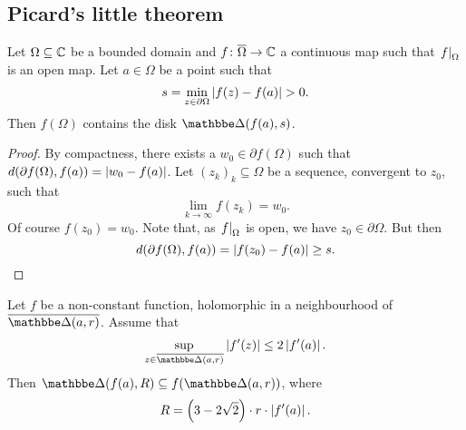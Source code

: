 \newpage

\subsection{Picard's little theorem}


\begin{lema}
Let $\Omega \subseteq \mathbb{C}$ be a bounded domain and
$f \colon \overline{\Omega} \to \mathbb{C}$ a continuous map such that
$\left. f\right|_{\Omega}^{}$ is an open map. Let $a \in \Omega$ be a point
such that
\[
s = \min_{z \in \partial \Omega} \left\lvert f(z) - f(a)\right\rvert > 0.
\]
Then $f(\Omega)$ contains the disk $\dsk(f(a), s)$.
\end{lema}

\begin{proof}
By compactness, there exists a $w_0 \in \partial f(\Omega)$ such
that $d(\partial f(\Omega), f(a)) = \left\lvert w_0 - f(a)\right\rvert$. Let
$(z_k)_k \subseteq \Omega$ be a sequence, convergent to $z_0$, such
that
\[
\lim_{k \to \infty} f(z_k) = w_0.
\]
Of course $f(z_0) = w_0$. Note that, as $\left. f\right|_{\Omega}^{}$ is
open, we have $z_0 \in \partial \Omega$. But then
\[
d(\partial f(\Omega), f(a)) = \left\lvert f(z_0) - f(a)\right\rvert \geq s. \qedhere
\]
\end{proof}

\begin{lema}
\label{thm_hol:lm:bloch}
Let $f$ be a non-constant function, holomorphic in a neighbourhood
of $\oline{\dsk(a, r)}$. Assume that
\[
\sup_{z \in \oline{\dsk(a,r)}} \abs{f'(z)} \leq 2 \abs{f'(a)}.
\]
Then $\dsk(f(a), R) \subseteq f(\dsk(a, r))$, where
\[
R = \left(3 - 2 \sqrt{2}\right) \cdot r \cdot \left\lvert f'(a)\right\rvert.
\]
\end{lema}

